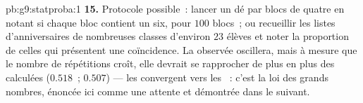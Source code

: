 \begin{solution}{pb:g9:statproba:1}
\textbf{15.} Protocole possible~: lancer un dé par blocs de quatre
en notant si chaque bloc contient un six, pour $100$ blocs~; ou
recueillir les listes d'anniversaires de nombreuses classes
d'environ $23$ élèves et noter la proportion de celles qui
présentent une coïncidence. La  observée oscillera, mais à
mesure que le nombre de répétitions croît, elle devrait se
rapprocher de plus en plus des  calculées ($0.518$~;
$0.507$) --- les  convergent vers les ~: c'est
la loi des grands nombres, énoncée ici comme une attente et
démontrée dans le  suivant.
\end{solution}
